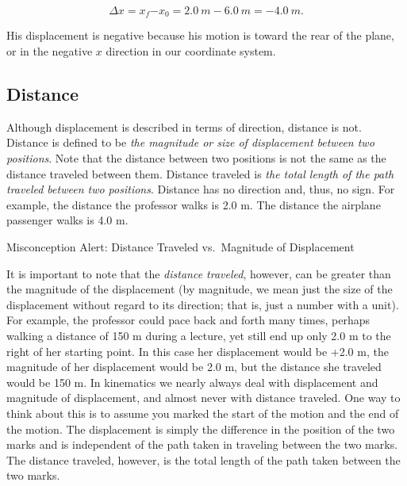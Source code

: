 \documentclass[
]{book}
\newenvironment{note}{}{}
\begin{document}
\leavevmode\hypertarget{eip-778}{}%
\[{{\Delta x = x_{f}{- x_{0}} = 2}\text{.}0\ m - 6\text{.}0\ m = {- 4}\text{.}0\ m}.\]

His displacement is negative because his motion is toward the rear of
the plane, or in the negative \(x{}\) direction in our coordinate system.

\hypertarget{fs-id1414454}{}
\hypertarget{distance}{%
\subsection{Distance}\label{distance}}

Although displacement is described in terms of direction, distance is
not. {Distance} is defined to be \emph{the magnitude or
size of displacement between two positions}. Note that the distance
between two positions is not the same as the distance traveled between
them. {Distance traveled} is \emph{the total length of the
path traveled between two positions}. Distance has no direction and,
thus, no sign. For example, the distance the professor walks is 2.0 m.
The distance the airplane passenger walks is 4.0 m.

\hypertarget{fs-id3044492}{}
\begin{note}

Misconception Alert: Distance Traveled vs.~Magnitude of Displacement

It is important to note that the \emph{distance traveled},
\emph{}however, can be greater than the
magnitude of the displacement (by magnitude, we mean just the size of
the displacement without regard to its direction; that is, just a number
with a unit). For example, the professor could pace back and forth many
times, perhaps walking a distance of 150 m during a lecture, yet still
end up only 2.0 m to the right of her starting point. In this case her
displacement would be +2.0 m, the magnitude of her displacement would be
2.0 m, but the distance she traveled would be 150 m. In kinematics we
nearly always deal with displacement and magnitude of displacement, and
almost never with distance traveled. One way to think about this is to
assume you marked the start of the motion and the end of the motion. The
displacement is simply the difference in the position of the two marks
and is independent of the path taken in traveling between the two marks.
The distance traveled, however, is the total length of the path taken
between the two marks.

\end{note}
\end{document}
